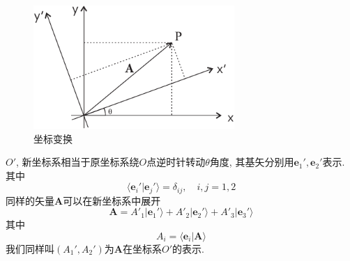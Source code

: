 \documentclass[a4paper,11pt]{book}
\begin{document}
\begin{figure}
\includegraphics[width=3in]{fig9.pdf}
\caption{坐标变换}\label{fig9}
\end{figure}
$O'$, 新坐标系相当于原坐标系绕$O$点逆时针转动$\theta$角度, 其基矢分别用$\mathbf{e}_1',\mathbf{e}_2'$表示. 其中
\begin{equation*}
  \langle\mathbf{e}_i'|\mathbf{e}_j'\rangle=\delta_{ij},\quad i,j=1,2
\end{equation*}
同样的矢量$\mathbf{A}$可以在新坐标系中展开
\begin{equation*}
  \mathbf{A}=A'_1|\mathbf{e}_1'\rangle+A'_2|\mathbf{e}_2'\rangle+A'_3|\mathbf{e}_3'\rangle
\end{equation*}
其中
\begin{equation*}
  A_i=\langle\mathbf{e}_i|\mathbf{A}\rangle
\end{equation*}
我们同样叫$(A_1',A_2')$为$\mathbf{A}$在坐标系$O'$的表示.
\end{document}
